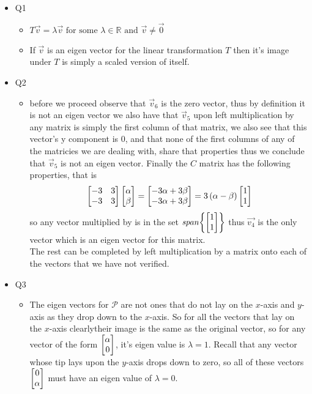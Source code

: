 \documentclass[11pt]{book}
\begin{document}
\begin{itemize}
    \item Q1
        \begin{itemize}
            \item $T\vec{v} = \lambda \vec{v} \text{ for some } \lambda \in \mathbb{R} \text{ and } \vec{v} \neq \vec{0} $ 
            \item If $\vec{v} $ is an eigen vector for the linear transformation $T$ then it's image under $T$ is simply a scaled version of itself. 
        \end{itemize}
    \item Q2
        \begin{itemize}
            \item before we proceed observe that $\vec{v} _{6} $ is the zero vector, thus by definition it is not an eigen vector we also have that $\vec{v} _{5} $ upon left multiplication by any matrix is simply the first column of that matrix, we also see that this vector's y component is 0, and that none of the first columns of any of the matricies we are dealing with, share that properties thus we conclude that $\vec{v} _{5} $ is not an eigen vector. Finally the $C$ matrix has the following properties, that is 
                \[
                    \begin{bmatrix} -3 & 3 \\ -3 & 3 \end{bmatrix}\begin{bmatrix} \alpha  \\ \beta  \end{bmatrix} = \begin{bmatrix}  - 3\alpha  + 3\beta  \\  - 3\alpha  + 3\beta  \end{bmatrix} = 3\left( \alpha  - \beta  \right) \begin{bmatrix} 1 \\ 1 \end{bmatrix} 
                \]
                so any vector multiplied by is in the set $\mathit{span} {\left\{ \begin{bmatrix} 1 \\ 1 \end{bmatrix}  \right\} } $ thus $\vec{v_4} $ is the only vector which is an eigen vector for this matrix.\\
                The rest can be completed by left multiplication by a matrix onto each of the vectors that we have not verified.
        \end{itemize}
        \item Q3
            \begin{itemize}
                \item The eigen vectors for $\mathcal{P} $ are not ones that do not lay on the $x$-axis and $y$-axis as they drop down to the $x$-axis. So for all the vectors that lay on the $x$-axis clearlytheir image is the same as the original vector, so for any vector of the form $\begin{bmatrix} \alpha  \\ 0 \end{bmatrix} $,  it's eigen value is $\lambda = 1$. Recall that any vector whose tip lays upon the $y$-axis drops down to zero, so all of these vectors $\begin{bmatrix} 0 \\ \alpha  \end{bmatrix} $  must have an eigen value of $\lambda = 0$.

\end{itemize}
\end{itemize}
\end{document}
